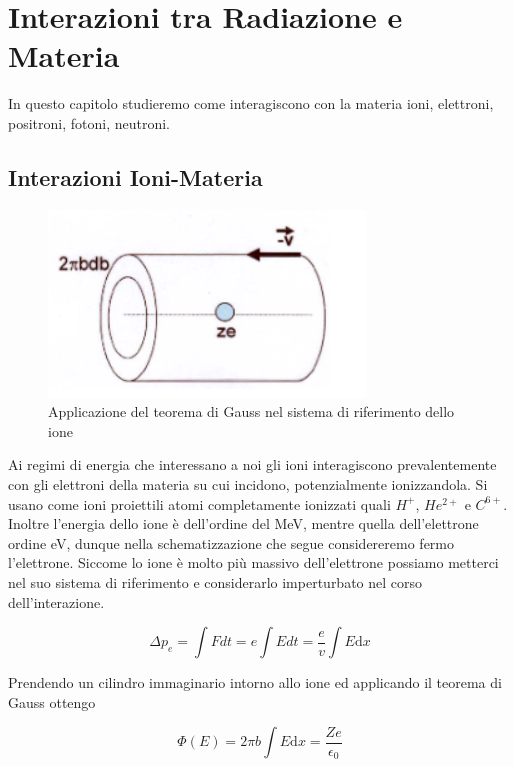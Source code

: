 
\chapter{Interazioni tra Radiazione e Materia}

In questo capitolo studieremo come interagiscono con la materia ioni, elettroni, positroni, fotoni, neutroni.

\section{Interazioni Ioni-Materia}

\begin{figure}
\centering
	\includegraphics[keepaspectratio]{figs/rutherford.png}
	\caption{Applicazione del teorema di Gauss nel sistema di riferimento dello ione}
	\label{fig:rutherford}
\end{figure}


Ai regimi di energia che interessano a noi gli ioni interagiscono prevalentemente con gli elettroni della materia su cui incidono, potenzialmente ionizzandola. Si usano come ioni proiettili atomi completamente ionizzati quali $H^+$, $He^{2+}$ e $C^{6+}$.
Inoltre l'energia dello ione è dell'ordine del MeV, mentre quella dell'elettrone ordine eV, dunque nella schematizzazione che segue considereremo fermo l'elettrone.
Siccome lo ione è molto più massivo dell'elettrone possiamo metterci nel suo sistema di riferimento e considerarlo imperturbato nel corso dell'interazione. 

\begin{equation}
\Delta p_e=\int Fdt = e\int Edt = \frac {e}{v}\int E \mathrm{d}x
\end{equation}

Prendendo un cilindro immaginario intorno allo ione ed applicando il teorema di Gauss ottengo

\begin{equation}
\Phi(E)=2\pi b \int E \mathrm{d}x =\frac{Ze}{\epsilon_0}
\end{equation}

